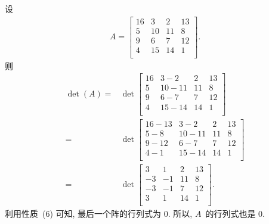 \documentclass[../libro.tex]{subfiles}
\begin{document}
\begin{example}
    设
    \begin{align*}
        A =
        \begin{bmatrix}
            16 & 3  & 2  & 13 \\
            5  & 10 & 11 & 8  \\
            9  & 6  & 7  & 12 \\
            4  & 15 & 14 & 1  \\
        \end{bmatrix}.
    \end{align*}
    则
    \begin{align*}
        \det {(A)}
        = {} &
        \det {
            \begin{bmatrix}
                16 & 3 - 2   & 2  & 13 \\
                5  & 10 - 11 & 11 & 8  \\
                9  & 6 - 7   & 7  & 12 \\
                4  & 15 - 14 & 14 & 1  \\
            \end{bmatrix}
        }
        \\
        = {} &
        \det {
            \begin{bmatrix}
                16 - 13 & 3 - 2   & 2  & 13 \\
                5 - 8   & 10 - 11 & 11 & 8  \\
                9 - 12  & 6 - 7   & 7  & 12 \\
                4 - 1   & 15 - 14 & 14 & 1  \\
            \end{bmatrix}
        }
        \\
        = {} &
        \det {
            \begin{bmatrix}
                3  & 1  & 2  & 13 \\
                -3 & -1 & 11 & 8  \\
                -3 & -1 & 7  & 12 \\
                3  & 1  & 14 & 1  \\
            \end{bmatrix}
        }.
    \end{align*}
    利用性质~(6) 可知, 最后一个阵的行列式为 \(0\).
    所以, \(A\)~的行列式也是 \(0\).


\end{example}
\end{document}
